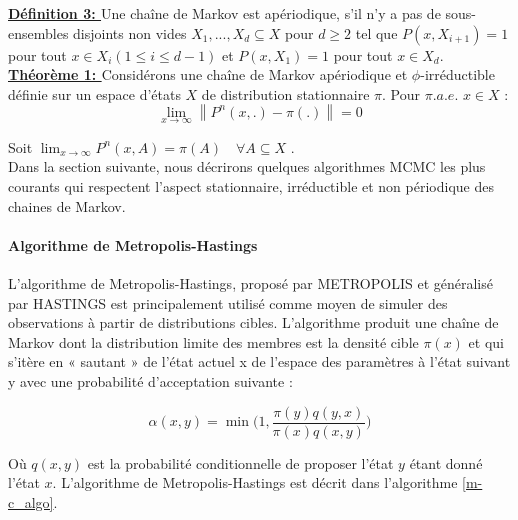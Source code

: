 \noindent \textbf{\underline{Définition 3: }} Une chaîne de Markov est apériodique, s'il n'y a pas de sous-ensembles disjoints non vides \(\displaystyle X_{1},...,X_{d} \subseteq X\) pour \(\displaystyle d \geq 2\) tel que \(\displaystyle P(x,X_{i+1}) = 1\) pour tout \(\displaystyle x \in X_{i} (1\leq i \leq d-1 ) \) et \(\displaystyle P(x,X_{1}) = 1 \) pour tout \(\displaystyle x \in X_{d}\). \\

\noindent \textbf{\underline{Théorème 1: }} Considérons une chaîne de Markov apériodique et \(\displaystyle \phi \)-irréductible définie sur un espace d'états \(\displaystyle X \) de distribution stationnaire \(\displaystyle \pi \). Pour \(\displaystyle \pi.a.e. \) \(\displaystyle x \in X \) :
\begin{equation}
	\lim_{x \to \infty} \left\lVert P^{n}(x,.) - \pi(.) \right\rVert = 0
\end{equation} 

\noindent Soit \(\displaystyle \lim_{x \to \infty} P^{n}(x,A) = \pi(A) \hspace{1em} \forall A \subseteq  X \) . \\
Dans la section suivante, nous décrirons quelques algorithmes MCMC les plus courants qui respectent l’aspect stationnaire, irréductible et non périodique des chaines de Markov.
\paragraph{Algorithme de Metropolis-Hastings \\}
L’algorithme de Metropolis-Hastings, proposé par METROPOLIS \cite{metropolis1953equation} et généralisé par HASTINGS \cite{hastings1970monte} est principalement utilisé comme moyen de simuler des observations à partir de distributions cibles. L'algorithme produit une chaîne de Markov dont la distribution limite des membres est la densité cible \(\displaystyle \pi(x) \) et qui s’itère en « sautant » de l’état actuel x de l’espace des paramètres à l’état suivant y avec une probabilité d’acceptation suivante :

\begin{equation}
	\alpha(x,y) = \min\Biggl( 1, \frac{\pi(y)q(y,x)}{\pi(x)q(x,y)} \Biggr)
\end{equation}

Où \(\displaystyle q(x,y) \) est la probabilité conditionnelle de proposer l'état \(\displaystyle y \) étant donné l'état \(\displaystyle x \). L'algorithme de Metropolis-Hastings est décrit dans l’algorithme \ref{m-c_algo}.

